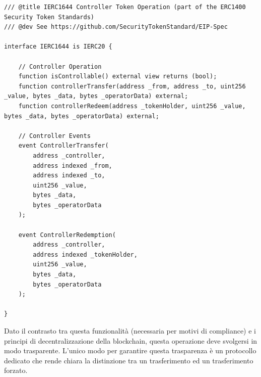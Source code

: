\begin{lstlisting}[language=Solidity,numbers=none]
/// @title IERC1644 Controller Token Operation (part of the ERC1400 Security Token Standards)
/// @dev See https://github.com/SecurityTokenStandard/EIP-Spec

interface IERC1644 is IERC20 {

    // Controller Operation
    function isControllable() external view returns (bool);
    function controllerTransfer(address _from, address _to, uint256 _value, bytes _data, bytes _operatorData) external;
    function controllerRedeem(address _tokenHolder, uint256 _value, bytes _data, bytes _operatorData) external;

    // Controller Events
    event ControllerTransfer(
        address _controller,
        address indexed _from,
        address indexed _to,
        uint256 _value,
        bytes _data,
        bytes _operatorData
    );

    event ControllerRedemption(
        address _controller,
        address indexed _tokenHolder,
        uint256 _value,
        bytes _data,
        bytes _operatorData
    );

}
\end{lstlisting}

Dato il contrasto tra questa funzionalità (necessaria per motivi di compliance) e i principi di decentralizzazione della blockchain, questa operazione deve svolgersi in modo trasparente. L'unico modo per garantire questa trasparenza è un protocollo dedicato che rende chiara la distinzione tra un trasferimento ed un trasferimento forzato. 


